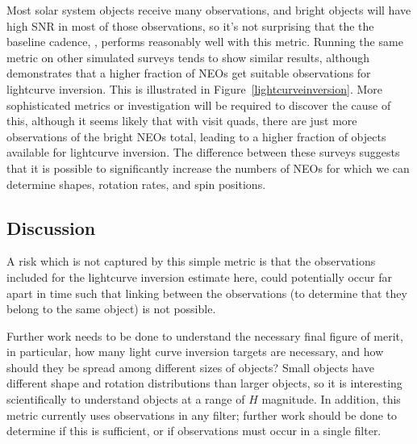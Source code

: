 Most solar system objects receive many observations, and bright
objects will have high SNR in most of those observations, so it's not
surprising that the the baseline cadence, ,
performs reasonably well with this metric. Running the same metric on
other simulated surveys tends to show similar results, although
 demonstrates that a higher fraction
of NEOs get suitable observations for lightcurve inversion. This is
illustrated in Figure~\ref{lightcurveinversion}. More
sophisticated metrics or investigation will be required to discover
the cause of this, although it seems likely that with visit quads,
there are just more observations of the bright NEOs total, leading to
a higher fraction of objects available for lightcurve inversion. The
difference between these surveys suggests that it is possible to
significantly increase the numbers of NEOs for which we can determine
shapes, rotation rates, and spin positions.


\subsection{Discussion}
\label{sec:\secname:discussion}

A risk which is not captured by this simple metric is that the
observations included for the lightcurve inversion estimate here,
could potentially occur far apart in time such that linking between
the observations (to determine that they belong to the same object) is
not possible.

Further work needs to be done to understand the necessary final figure
of merit, in particular, how many light curve inversion targets are
necessary, and how should they be spread among different sizes of
objects? Small objects have different shape and
rotation distributions than larger objects, so it is interesting
scientifically to understand objects at a range of $H$ magnitude. In
addition, this metric currently uses observations in any filter;
further work should be done to determine if this is sufficient, or if
observations must occur in a single filter.


\navigationbar

